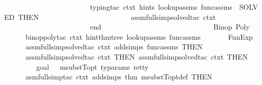 \begin{isabellebody}
\ \ \ \ \ \ \ \ \ \ \ \ \ \ \ \ \ \ \ \ \ \ \ \ {\isacharparenleft}{\kern0pt}typing{\isacharunderscore}{\kern0pt}tac\ ctxt\ hints{}\ lookup{\isacharunderscore}{\kern0pt}assms\ func{\isacharunderscore}{\kern0pt}assms\ {\isacharbar}{\kern0pt}{\isachargreater}{\kern0pt}\ SOLVED{\isacharprime}{\kern0pt}{\isacharparenright}{\kern0pt}\ THEN{\isacharprime}{\kern0pt}\ \isanewline
\ \ \ \ \ \ \ \ \ \ \ \ \ \ \ \ \ \ \ \ \ \ \ \ assm{\isacharunderscore}{\kern0pt}full{\isacharunderscore}{\kern0pt}simp{\isacharunderscore}{\kern0pt}solved{\isacharunderscore}{\kern0pt}tac\ ctxt\isanewline
\ \ \ \ \ \ \ \ \ \ \ \ \ \ \ \ \ \ \ \ \ \ \ \ end\isanewline
\ \ \ \ \ \ \ \ \ \ \ \ \ \ \ \ \ \ \ \ \ \ \ {\isacharparenright}{\kern0pt}{\isacharcomma}{\kern0pt}\isanewline
\isanewline
\ \ \ \ \ \ {\isacharparenleft}{\kern0pt}{\isacharasterisk}{\kern0pt}\ Binop\ Poly\ {\isacharasterisk}{\kern0pt}{\isacharparenright}{\kern0pt}\isanewline
\ \ \ \ \ \ binop{\isacharunderscore}{\kern0pt}poly{\isacharunderscore}{\kern0pt}tac\ ctxt\ hint{\isacharunderscore}{\kern0pt}thm{\isacharunderscore}{\kern0pt}tree\ lookup{\isacharunderscore}{\kern0pt}assms\ func{\isacharunderscore}{\kern0pt}assms{\isacharcomma}{\kern0pt}\isanewline
\ \ \ \ \ \ {\isacharparenleft}{\kern0pt}{\isacharasterisk}{\kern0pt}\ FunExp\ {\isacharasterisk}{\kern0pt}{\isacharparenright}{\kern0pt}\isanewline
\ \ \ \ \ \ {\isacharparenleft}{\kern0pt}assm{\isacharunderscore}{\kern0pt}full{\isacharunderscore}{\kern0pt}simp{\isacharunderscore}{\kern0pt}solved{\isacharunderscore}{\kern0pt}tac\ {\isacharparenleft}{\kern0pt}ctxt\ addsimps\ func{\isacharunderscore}{\kern0pt}assms{\isacharparenright}{\kern0pt}{\isacharparenright}{\kern0pt}\ THEN{\isacharprime}{\kern0pt}\isanewline
\ \ \ \ \ \ assm{\isacharunderscore}{\kern0pt}full{\isacharunderscore}{\kern0pt}simp{\isacharunderscore}{\kern0pt}solved{\isacharunderscore}{\kern0pt}tac\ ctxt\ THEN{\isacharprime}{\kern0pt}\ assm{\isacharunderscore}{\kern0pt}full{\isacharunderscore}{\kern0pt}simp{\isacharunderscore}{\kern0pt}solved{\isacharunderscore}{\kern0pt}tac\ ctxt\ THEN{\isacharprime}{\kern0pt}\ \isanewline
\ \ \ \ \ \ \ \ {\isacharparenleft}{\kern0pt}{\isacharasterisk}{\kern0pt}\ goal{\isacharcolon}{\kern0pt}\ {\isasymtau}\ {\isacharequal}{\kern0pt}\ {\isacharparenleft}{\kern0pt}msubstT{\isacharunderscore}{\kern0pt}opt\ ty{\isacharunderscore}{\kern0pt}params\ ret{\isacharunderscore}{\kern0pt}ty{\isacharparenright}{\kern0pt}\ {\isacharasterisk}{\kern0pt}{\isacharparenright}{\kern0pt}\isanewline
\ \ \ \ \ \ asm{\isacharunderscore}{\kern0pt}full{\isacharunderscore}{\kern0pt}simp{\isacharunderscore}{\kern0pt}tac\ {\isacharparenleft}{\kern0pt}ctxt\ addsimps\ {\isacharbrackleft}{\kern0pt}{\isacharat}{\kern0pt}{\isacharbraceleft}{\kern0pt}thm\ msubstT{\isacharunderscore}{\kern0pt}opt{\isacharunderscore}{\kern0pt}def{\isacharbraceright}{\kern0pt}{\isacharbrackright}{\kern0pt}{\isacharparenright}{\kern0pt}\ THEN{\isacharprime}{\kern0pt}\isanewline

\end{isabellebody}
